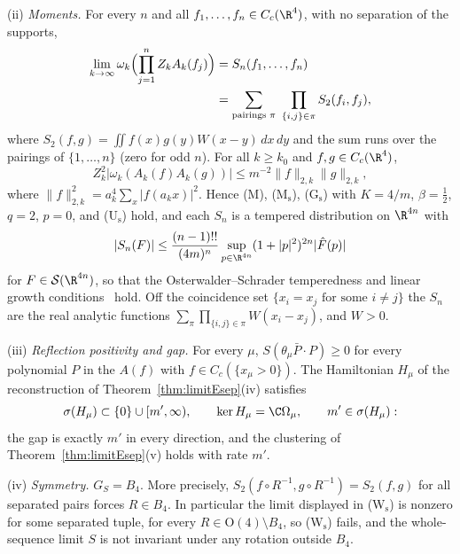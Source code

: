 \begin{theorem}
\textup{(ii)} \emph{Moments.} For every $n$ and all $f_1,\dots,f_n\in C_c
(\R^4)$, with no separation of the supports,
\[
\begin{split}
\lim_{k\to\infty}\omega_k\Bigl(\prod_{j=1}^nZ_kA_k(f_j)\Bigr)
&=S_n(f_1,\dots,f_n)\\
&=\sum_{\text{pairings }\pi}\ \prod_{\{i,j\}\in\pi}S_2(f_i,f_j),
\end{split}
\]
where $S_2(f,g)=\iint f(x)g(y)W(x-y)\,dx\,dy$ and the sum runs over the pairings of $\{1,\dots,n\}$ \textup{(}zero for odd
$n$\textup{)}. For all $k\ge k_0$ and $f,g\in C_c(\R^4)$,
\begin{equation}\label{rN5:eq:l2}
Z_k^2\bigl|\omega_k(A_k(f)A_k(g))\bigr|\le m^{-2}\|f\|_{2,k}\|g\|_{2,k},
\end{equation}
where $\|f\|_{2,k}^2=a_k^4\sum_x|f(a_kx)|^2$.
Hence \textup{(M)}, \textup{(M$_{\mathrm s}$)}, \textup{(G$_{\mathrm s}$)}
with $K=4/m$, $\beta=\frac12$, $q=2$, $p=0$, and \textup{(U$_{\mathrm s}$)}
hold, and each $S_n$ is a tempered distribution on $\R^{4n}$ with
\begin{equation}\label{rN5:eq:tempered}
|S_n(F)|\le\frac{(n-1)!!}{(4m)^n}\sup_{p\in\R^{4n}}(1+|p|^2)^{2n}|\hat F(p)|
\end{equation}
for $F\in\mathcal S(\R^{4n})$,
so that the Osterwalder--Schrader temperedness and linear growth
conditions~\cite{OS75} hold. Off the coincidence set
$\{x_i=x_j\text{ for some }i\ne j\}$ the $S_n$ are the real analytic
functions $\sum_\pi\prod_{\{i,j\}\in\pi}W(x_i-x_j)$, and $W>0$.

\textup{(iii)} \emph{Reflection positivity and gap.} For every $\mu$, $S(
\theta_\mu\bar P\cdot P)\ge0$ for every polynomial $P$ in the $A(f)$ with
$f\in C_c(\{x_\mu>0\})$. The Hamiltonian $H_\mu$ of the reconstruction of
Theorem~\textup{\ref{thm:limitEsep}(iv)} satisfies
\[
\sigma(H_\mu)\subset\{0\}\cup[m',\infty),\qquad\ker H_\mu=\C\Omega_\mu,
\qquad m'\in\sigma(H_\mu):
\]
the gap is exactly $m'$ in every direction, and the clustering of
Theorem~\textup{\ref{thm:limitEsep}(v)} holds with rate $m'$.

\textup{(iv)} \emph{Symmetry.} $G_S=B_4$. More precisely, $S_2(f\circ R^{-1},
g\circ R^{-1})=S_2(f,g)$ for all separated pairs forces $R\in B_4$. In
particular the limit displayed in \textup{(W$_{\mathrm s}$)} is nonzero for
some separated tuple, for every $R\in\mathrm O(4)\setminus B_4$, so
\textup{(W$_{\mathrm s}$)} fails, and the whole-sequence limit $S$ is not
invariant under any rotation outside $B_4$.
\end{theorem}

